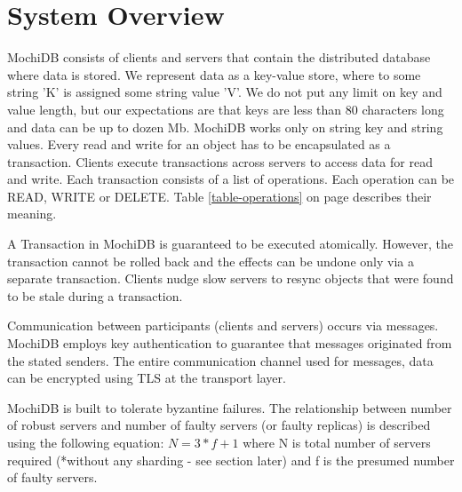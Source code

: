 \documentclass[letterpaper,twocolumn,10pt]{article}
\begin{document}
\section{System Overview}
MochiDB consists of clients and servers that contain the distributed database where data is stored. We represent data as a key-value store, where to some string 'K' is assigned some string value 'V'. We do not put any limit on key and value length, but our expectations are that keys are less than 80 characters long and data can be up to dozen Mb. MochiDB works only on string key and string values. Every read and write for an object has to be encapsulated as a transaction. Clients execute transactions across servers to access data for read and write. Each transaction consists of a list of operations. Each operation can be READ, WRITE or DELETE. Table \ref{table-operations} on page \pageref{table-operations} describes their meaning.

\begin{table}[]
\centering
\caption{MochiDB client operations}
\label{table-operations}
\end{table}

A Transaction in MochiDB is guaranteed to be executed atomically. However, the transaction cannot be rolled back and the effects can be undone only via a separate transaction. Clients nudge slow servers to resync objects that were found to be stale during a transaction.

Communication between participants (clients and servers) occurs via messages. MochiDB employs key authentication to guarantee that messages originated from the stated senders. The entire communication channel used for messages, data can be encrypted using TLS at the transport layer.

MochiDB is built to tolerate byzantine failures. The relationship between number of robust servers and number of faulty servers (or faulty replicas) is described using the following equation:
$N = 3*f + 1$  where N is total number of servers required (*without any sharding - see section later) and f is the presumed number of faulty servers.
\end{document}
